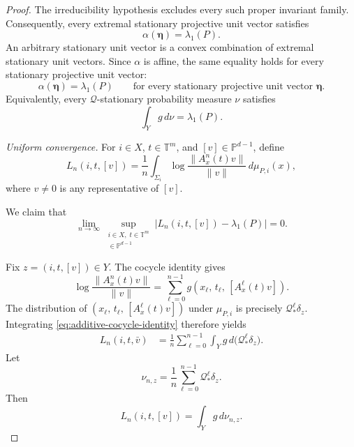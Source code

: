 \documentclass[11pt,a4paper]{amsart}
\newcommand{\T}{\mathbb T}
\newcommand{\PP}{\mathbb P}
\begin{document}
\begin{proof}
The irreducibility hypothesis excludes every such proper invariant
family.  Consequently, every extremal stationary projective unit
vector satisfies
\[
 \alpha(\boldsymbol\eta)=\lambda_1(P).
\]
An arbitrary stationary unit vector is a convex combination of extremal
stationary unit vectors.  Since
\(\alpha\) is affine, the same equality holds for every stationary
projective unit vector:
\begin{equation}\label{eq:every-stationary-vector-realizes-top}
 \alpha(\boldsymbol\eta)=\lambda_1(P)
 \qquad
 \text{for every stationary projective unit vector }
 \boldsymbol\eta.
\end{equation}
Equivalently, every \(\mathcal Q\)-stationary probability measure
\(\nu\) satisfies
\begin{equation}\label{eq:every-stationary-measure-realizes-top}
 \int_Y g\,d\nu=\lambda_1(P).
\end{equation}

\medskip
\noindent\emph{Uniform convergence.}
For \(i\in X\), \(t\in\T^m\), and \([v]\in\PP^{d-1}\), define
\begin{equation}\label{eq:averaged-finite-time-expansion}
 L_n(i,t,[v])
 =
 \frac1n
 \int_{\Sigma_i}
 \log\frac{\|A_x^n(t)v\|}{\|v\|}
 \,d\mu_{P,i}(x),
\end{equation}
where \(v\neq0\) is any representative of \([v]\).%

We claim that
\begin{equation}\label{eq:uniform-averaged-growth}
 \lim_{n\to\infty}
 \sup_{\substack{i\in X,\;t\in\T^m\\
                 [v]\in\PP^{d-1}}}
 \left|
 L_n(i,t,[v])-\lambda_1(P)
 \right|
 =
 0.
\end{equation}

Fix $z=(i,t,[v])\in Y$. The cocycle identity gives
\begin{equation}\label{eq:additive-cocycle-identity}
 \log\frac{\|A_x^n(t)v\|}{\|v\|}
 =
 \sum_{\ell=0}^{n-1}
 g\left(
 x_\ell,\,
 t_\ell,\,
 [A_x^\ell(t)v]
 \right).
\end{equation}
The distribution of $\left(
 x_\ell,\,
 t_\ell,\,
 [A_x^\ell(t)v]
 \right)$
under \(\mu_{P,i}\) is precisely
\(\mathcal Q^\ell_*\delta_z\).  Integrating
\eqref{eq:additive-cocycle-identity} therefore yields
\begin{align}
 L_n(i,t,\bar v)
 &=
 \frac1n
 \sum_{\ell=0}^{n-1}
 \int_Yg\,d\bigl(\mathcal Q^\ell_*\delta_z\bigr).
 \label{eq:Ln-kernel-iterates}
\end{align}
Let
\begin{equation}\label{eq:projective-occupation-measure}
 \nu_{n,z}
 =
 \frac1n
 \sum_{\ell=0}^{n-1}
 \mathcal Q^\ell_*\delta_z.
\end{equation}
Then
\begin{equation}\label{eq:Ln-occupation-integral}
 L_n(i,t,[v])
 =
 \int_Yg\,d\nu_{n,z}.
\end{equation}


\end{proof}
\end{document}
